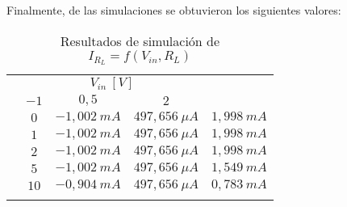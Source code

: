 Finalmente, de las simulaciones se obtuvieron los siguientes valores:
\begin{table}[H]
    \centering
    \begin{tabular}{|c|c|c|c|c|}
        \hhline{-----}
        \multicolumn{2}{|c|}{\multirow{2}{*}{$I_{R_L}$}} & \multicolumn{3}{c|}{$V_{in}~[V]$}\\
        \hhline{~~---}
        \multicolumn{2}{|c|}{} & $-1$ & $0,5$ & $2$ \\
        \hhline{-----}
        \multirow{5}{*}{$R_L~[k\Omega]$}
        & $0$ & $-1,002~mA$ & $497,656~\mu A$ & $1,998~mA$ \\
        \hhline{~----}
        & $1$ & $-1,002~mA$ & $497,656~\mu A$ & $1,998~mA$ \\
        \hhline{~----}
        & $2$ & $-1,002~mA$ & $497,656~\mu A$ & $1,998~mA$ \\
        \hhline{~----}
        & $5$ & $-1,002~mA$ & $497,656~\mu A$ & $1,549~mA$ \\
        \hhline{~----}
        & $10$ & $-0,904~mA$ & $497,656~\mu A$ & $0,783~mA$ \\
        \hhline{-----}
    \end{tabular}
    \caption{Resultados de simulación de $I_{R_L}=f(V_{in},R_L)$}
    \label{tab:ResultadosSimulacion}
\end{table}
